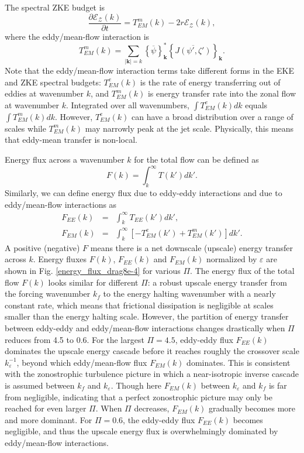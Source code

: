 \documentclass{ametsoc}
\begin{document}
The spectral ZKE budget is
\begin{equation}
\frac{\partial\mathcal{E}_{\mathcal{Z}}(k)}{\partial t}=T_{EM}^{m}(k)-2r\mathcal{E}_{\mathcal{Z}}(k),\label{eq:spectral_ZKE_budget}
\end{equation}
where the eddy/mean-flow interaction is
\begin{equation}
T_{EM}^{m}(k)=\underset{|\mathbf{k}|=k}{\sum}\left\{ \overline{\psi}\right\} _{\mathbf{k}}^{*}\left\{ \overline{J(\psi',\zeta')}\right\} _{\mathbf{k}}.
\end{equation}
Note that the eddy/mean-flow interaction terms take different forms in the EKE
and ZKE spectral budgets: $T_{EM}^{e}(k)$ is the rate of energy
transferring out of eddies at wavenumber $k$, and $T_{EM}^{m}(k)$ is
energy transfer rate into the zonal flow at wavenumber $k$. Integrated
over all wavenumbers, $\int T_{EM}^{e}(k)dk$ equals $\int T_{EM}^{m}(k)dk$.
However, $T_{EM}^{e}(k)$ can have a broad distribution over a range
of scales while $T_{EM}^{m}(k)$ may narrowly peak at the jet scale.
Physically, this means that eddy-mean transfer is non-local.

Energy flux across a wavenumber $k$ for the total flow can be defined
as
\begin{equation}
F(k)=\int_{k}^{\infty}T(k')dk'.\label{eq:energy_flux}
\end{equation}
Similarly, we can define energy flux due to eddy-eddy interactions
and due to eddy/mean-flow interactions as
\begin{eqnarray}
F_{EE}(k) & = & \int_{k}^{\infty}T_{EE}(k')dk',\label{eq:energy_flux_EE}\\
F_{EM}(k) & = & \int_{k}^{\infty}\left[-T_{EM}^{e}(k')+T_{EM}^{m}(k')\right]dk'.\label{eq:energy_flux_EM}
\end{eqnarray}
A positive (negative) $F$ means there is a net downscale (upscale)
energy transfer across $k$. Energy fluxes $F(k)$, $F_{EE}(k)$ and
$F_{EM}(k)$ normalized by $\varepsilon$ are shown in Fig. \ref{energy_flux_drag8e-4}
for various $\Pi$. The energy flux of the total flow $F(k)$ looks
similar for different $\Pi$: a robust upscale energy transfer from
the forcing wavenumber $k_{f}$ to the energy halting wavenumber with
a nearly constant rate, which means that frictional dissipation is
negligible at scales smaller than the energy halting scale. However,
the partition of energy transfer between eddy-eddy and eddy/mean-flow
interactions changes drastically when $\Pi$ reduces from 4.5 to 0.6.
For the largest $\Pi=4.5$, eddy-eddy flux $F_{EE}(k)$ dominates
the upscale energy cascade before it reaches roughly
the crossover scale $k_{\varepsilon}^{-1}$, beyond which eddy/mean-flow
flux $F_{EM}(k)$ dominates. This is consistent with the zonostrophic turbulence
picture in which a near-isotropic inverse cascade is assumed between
$k_{f}$ and $k_{\varepsilon}$. Though here $F_{EM}(k)$ between
$k_{\varepsilon}$ and $k_{f}$ is far from negligible, indicating
that a perfect zonostrophic picture may only be reached for even larger
$\Pi$. When $\Pi$ decreases, $F_{EM}(k)$ gradually becomes more 
and more dominant. For $\Pi=0.6$, the eddy-eddy
flux $F_{EE}(k)$ becomes negligible, and thus the upscale energy
flux is overwhelmingly dominated by eddy/mean-flow interactions.
\end{document}
